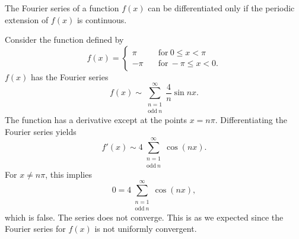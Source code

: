 \begin{Result}
  The Fourier series of a function $f(x)$ can be differentiated only if
  the periodic extension of $f(x)$ is continuous.
\end{Result}



\begin{Example}
  Consider the function defined by
  \[ f(x) =
  \begin{cases}
    \pi \quad &\mathrm{for}\ 0 \leq x < \pi \\
    -\pi \quad &\mathrm{for}\ -\pi \leq x < 0.
  \end{cases}
  \]
  $f(x)$ has the Fourier series
  \[ f(x) \sim \sum_{\substack{ {n} = 1 \\ \mathrm{odd}\ n}}^{\infty} \frac{4}{n} \sin{n x}. \]
  The function has a derivative except at the points $x = n\pi$.
  Differentiating the Fourier series yields
  \[ f'(x) \sim 4 \sum_{\substack{ {n} = 1 \\ \mathrm{odd}\ n}}^{\infty} \cos(n x).\]
  For $x \neq n\pi$, this implies
  \[ 0 = 4 \sum_{\substack{ {n} = 1 \\ \mathrm{odd}\ n}}^{\infty} \cos(n x),\]
  which is false.  The series does not converge.  This is as we expected
  since the Fourier series for $f(x)$ is not uniformly convergent.
\end{Example}







